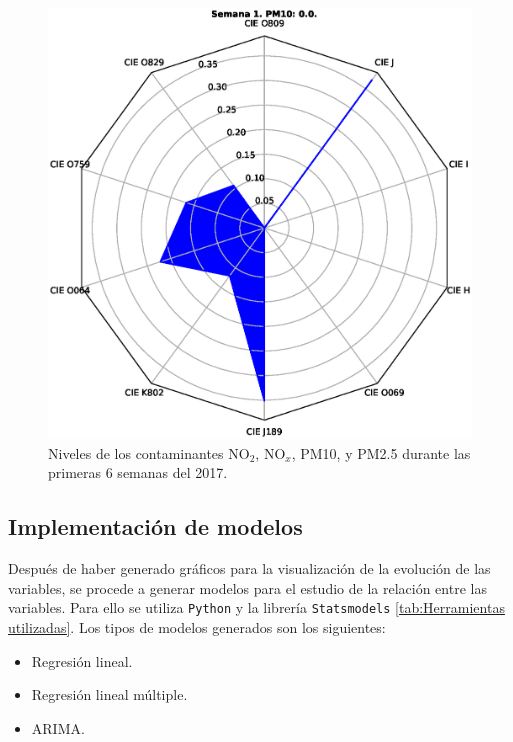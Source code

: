 \begin{figure}[h!]
\setcounter{figure}{1} %
\captionsetup{type=figure} %
\begin{center}
   \includegraphics[width=1\textwidth]{spiderweb_PM10_2014_1.eps}
   \end{center}
    \caption[Ejemplo de gráficos de radar]{Niveles de los contaminantes NO$_2$, NO$_x$, PM10, y PM2.5 durante las primeras 6 semanas del 2017.}
    \label{grafico_de_telaraña}
\end{figure}
\clearpage

\subsection{Implementación de modelos}
Después de haber generado gráficos para la visualización de la evolución de las variables, se procede a generar modelos para el estudio de la relación entre las variables. Para ello se utiliza \texttt{Python} y la librería \texttt{Statsmodels} \ref{tab:Herramientas utilizadas}. Los tipos de modelos generados son los siguientes:
\begin{itemize}
	\item Regresión lineal.
	\item Regresión lineal múltiple.
	\item ARIMA.
\end{itemize}
\clearpage

